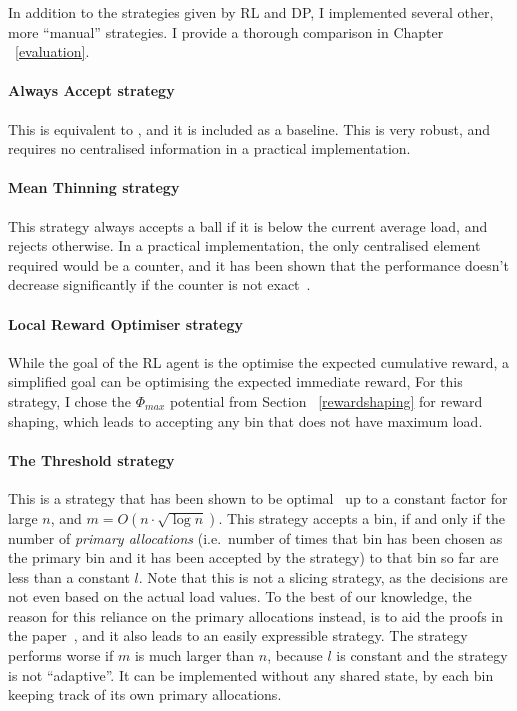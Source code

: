 In addition to the strategies given by RL and DP, I implemented several other, more ``manual'' strategies. I provide a thorough comparison in Chapter ~\ref{evaluation}.


\paragraph{Always Accept strategy}
This is equivalent to \OneChoice, and it is included as a baseline. This is very robust, and requires no centralised information in a practical implementation.


\paragraph{Mean Thinning strategy}
This strategy always accepts a ball if it is below the current average load, and rejects otherwise. In a practical implementation, the only centralised element required would be a counter, and it has been shown that the performance doesn't decrease significantly if the counter is not exact~\cite{los2022cachingpackingthinningtwinning}. 


\paragraph{Local Reward Optimiser strategy}

While the goal of the RL agent is the optimise the expected cumulative reward, a simplified goal can be optimising the expected immediate reward, For this strategy, I chose the $\Phi_{max}$ potential from Section ~\ref{rewardshaping} for reward shaping, which leads to accepting any bin that does not have maximum load.


\paragraph{The Threshold strategy} 

This is a strategy that has been shown to be optimal~\cite{feldheim2021thinning} up to a constant factor for large $n$, and $m = O(n \cdot \sqrt{\log n})$. This strategy accepts a bin, if and only if the number of \textit{primary allocations} (i.e.\ number of times that bin has been chosen as the primary bin and it has been accepted by the strategy) to that bin so far are less than a constant $l$. Note that this is not a slicing strategy, as the decisions are not even based on the actual load values. To the best of our knowledge, the reason for this reliance on the primary allocations instead, is to aid the proofs in the paper~\cite{feldheim2021thinning}, and it also leads to an easily expressible strategy. The strategy performs worse if $m$ is much larger than $n$, because $l$ is constant and the strategy is not ``adaptive''. It can be implemented without any shared state, by each bin keeping track of its own primary allocations.


